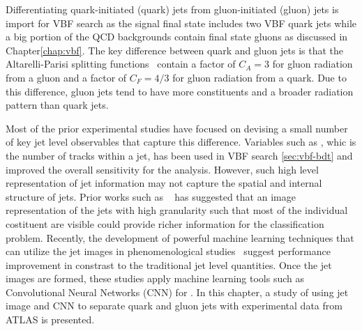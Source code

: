 Differentiating quark-initiated (quark) jets from gluon-initiated (gluon) jets is import for VBF \Hbb search as the signal final state includes two VBF quark jets while a big portion of the QCD backgrounds contain final state gluons as discussed in Chapter\ref{chap:vbf}. The key difference between quark and gluon jets is that the Altarelli-Parisi splitting functions~\cite{Altarelli:1977zs} contain a factor of $C_A=3$ for gluon radiation from a gluon and a factor of $C_F=4/3$ for gluon radiation from a quark. Due to this difference, gluon jets tend to have more constituents and a broader radiation pattern than quark jets.  

Most of the prior experimental studies have focused on devising a small number of key jet level observables that capture this difference. Variables such as \ntrk, whic is the number of tracks within a jet, has been used in VBF \Hbb search \ref{sec:vbf-bdt} and improved the overall sensitivity for the analysis. However, such high level representation of jet information may not capture the spatial and internal structure of jets. Prior works such as ~\cite{deOliveira:2015xxd} has suggested that an image representation of the jets with high granularity such that most of the individual costituent are visible could provide richer information for the classification problem. Recently, the development of powerful machine learning techniques that can utilize the jet images in phenomenological studies~\cite{Komiske:2016rsd,Dery:2017fap} suggest \qgtagging performance improvement in constrast to the traditional jet level quantities. Once the jet images are formed, these studies apply machine learning tools such as Convolutional Neural Networks (CNN) for \qgtagging. In this chapter, a study of using jet image and CNN to separate quark and gluon jets with experimental data from ATLAS is presented. 




